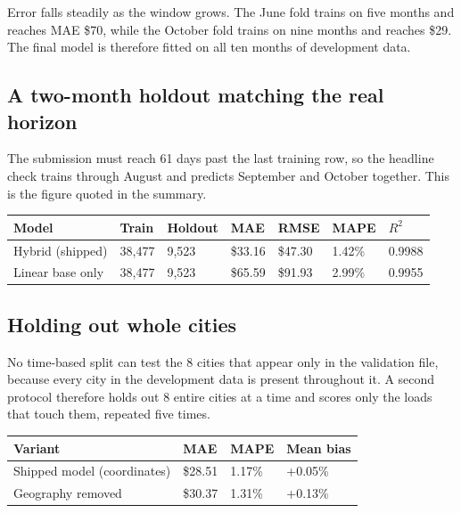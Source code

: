 \documentclass[11pt,a4paper]{article}
\begin{document}
Error falls steadily as the window grows. The June fold trains on five months and
reaches MAE \$70, while the October fold trains on nine months and reaches \$29.
The final model is therefore fitted on all ten months of development data.

\subsection{A two-month holdout matching the real horizon}

The submission must reach 61 days past the last training row, so the headline
check trains through August and predicts September and October together. This is
the figure quoted in the summary.

\begin{table}[H]
\small
\begin{tabularx}{\textwidth}{XR{0.12\textwidth}R{0.11\textwidth}R{0.11\textwidth}R{0.11\textwidth}R{0.10\textwidth}R{0.10\textwidth}}
\toprule
\textbf{Model} & \textbf{Train} & \textbf{Holdout} & \textbf{MAE} &
\textbf{RMSE} & \textbf{MAPE} & \textbf{$R^2$} \\
\midrule
Hybrid (shipped) & 38{,}477 & 9{,}523 & \$33.16 & \$47.30 & 1.42\% & 0.9988 \\
Linear base only & 38{,}477 & 9{,}523 & \$65.59 & \$91.93 & 2.99\% & 0.9955 \\
\bottomrule
\end{tabularx}
\end{table}

\subsection{Holding out whole cities}

No time-based split can test the 8 cities that appear only in the validation
file, because every city in the development data is present throughout it. A
second protocol therefore holds out 8 entire cities at a time and scores only
the loads that touch them, repeated five times.

\begin{table}[H]
\small
\begin{tabularx}{\textwidth}{XR{0.14\textwidth}R{0.14\textwidth}R{0.16\textwidth}}
\toprule
\textbf{Variant} & \textbf{MAE} & \textbf{MAPE} & \textbf{Mean bias} \\
\midrule
Shipped model (coordinates) & \$28.51 & 1.17\% & +0.05\% \\
Geography removed & \$30.37 & 1.31\% & +0.13\% \\
\bottomrule
\end{tabularx}
\end{table}
\end{document}
